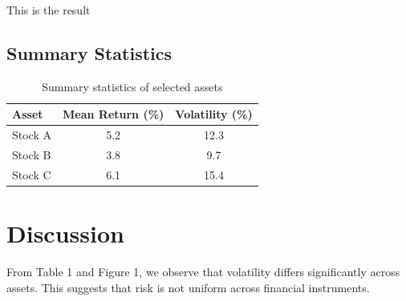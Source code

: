 
This is the result

\subsection{Summary Statistics}

\begin{table}[h]
\centering
\begin{tabular}{lcc}
\toprule
Asset & Mean Return (\%) & Volatility (\%) \\
\midrule
Stock A & 5.2 & 12.3 \\
Stock B & 3.8 & 9.7 \\
Stock C & 6.1 & 15.4 \\
\bottomrule
\end{tabular}
\caption{Summary statistics of selected assets}
\end{table}

\section{Discussion}

From Table 1 and Figure 1, we observe that volatility differs significantly across assets. This suggests that risk is not uniform across financial instruments.